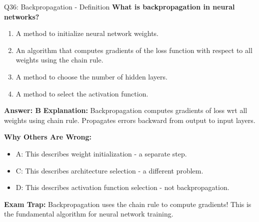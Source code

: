 \documentclass[8pt]{beamer}
\begin{document}
	\begin{frame}{Q36: Backpropagation - Definition}
		\fontsize{6.5}{7.5}\selectfont
		\textbf{What is backpropagation in neural networks?}
		
		\begin{enumerate}
			\item A method to initialize neural network weights.
			\item An algorithm that computes gradients of the loss function with respect to all weights using the chain rule.
			\item A method to choose the number of hidden layers.
			\item A method to select the activation function.
		\end{enumerate}
		
		\vspace{0.05cm}
		\textcolor{myblue}{\textbf{Answer: B}}
		\vspace{0.05cm}
		\textcolor{myblue}{\textbf{Explanation:}} Backpropagation computes gradients of loss wrt all weights using chain rule. Propagates errors backward from output to input layers.
		
		\vspace{0.05cm}
		\textcolor{myred}{\textbf{Why Others Are Wrong:}}
		\begin{itemize}
			\item \textcolor{myred}{A:} This describes weight initialization - a separate step.
			\item \textcolor{myred}{C:} This describes architecture selection - a different problem.
			\item \textcolor{myred}{D:} This describes activation function selection - not backpropagation.
		\end{itemize}
		
		\textcolor{myred}{\textbf{Exam Trap:}} Backpropagation uses the \textcolor{myblue}{chain rule} to compute gradients! This is the fundamental algorithm for neural network training.
	\end{frame}
	
\end{document}
